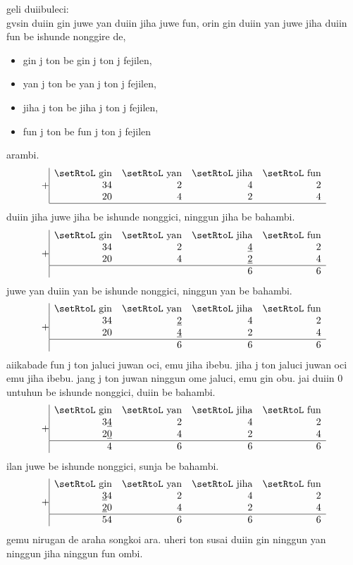 \documentclass{report}
\begin{document}
\newpage
geli duiibuleci: \\
gvsin duiin gin juwe yan duiin jiha juwe fun, orin gin duiin yan juwe jiha duiin fun be ishunde nonggire de,
\begin{itemize}
    \item gin j ton be gin j ton j fejilen,
    \item yan j ton be yan j ton j fejilen,
    \item jiha j ton be jiha j ton j fejilen,
    \item fun j ton be fun j ton j fejilen
\end{itemize}
arambi.
\[
    +\begin{array}{|rrrr}
        \text{\setRtoL gin} & \text{\setRtoL yan} & \text{\setRtoL jiha} & \text{\setRtoL fun}\\
        34 & 2 & 4 & 2\\
        20 & 4 & 2 & 4\\\hline
    \end{array}
\]
duiin jiha juwe jiha be ishunde nonggici, ninggun jiha be bahambi.
\[
    +\begin{array}{|rrrr}
        \text{\setRtoL gin} & \text{\setRtoL yan} & \text{\setRtoL jiha} & \text{\setRtoL fun}\\
        34 & 2 & \underline{4} & {2}\\
        20 & 4 & \underline{2} & {4}\\\hline
        & & 6 & 6
    \end{array}
\]
juwe yan duiin yan be ishunde nonggici, ninggun yan be bahambi.
\[
    +\begin{array}{|rrrr}
        \text{\setRtoL gin} & \text{\setRtoL yan} & \text{\setRtoL jiha} & \text{\setRtoL fun}\\
        34 & \underline{2} & 4 & {2}\\
        20 & \underline{4} & 2 & {4}\\\hline
        & 6 & 6 & 6
    \end{array}
\]
aiikabade fun j ton jaluci juwan oci, emu jiha ibebu. jiha j ton jaluci juwan oci emu jiha ibebu. jang j ton juwan ninggun ome jaluci, emu gin obu. jai duiin 0 untuhun be ishunde nonggici, duiin be bahambi.
\[
    +\begin{array}{|rrrr}
        \text{\setRtoL gin} & \text{\setRtoL yan} & \text{\setRtoL jiha} & \text{\setRtoL fun}\\
        3\underline{4} & {2} & 4 & {2}\\
        2\underline{0} & {4} & 2 & {4}\\\hline
        4 & 6 & 6 & 6
    \end{array}
\]
ilan juwe be ishunde nonggici, sunja be bahambi.
\[
    +\begin{array}{|rrrr}
        \text{\setRtoL gin} & \text{\setRtoL yan} & \text{\setRtoL jiha} & \text{\setRtoL fun}\\
        \underline{3}{4} & {2} & 4 & {2}\\
        \underline{2}{0} & {4} & 2 & {4}\\\hline
        54 & 6 & 6 & 6
    \end{array}
\]
gemu nirugan de araha songkoi ara. uheri ton susai duiin gin ninggun yan ninggun jiha ninggun fun ombi.
\end{document}
